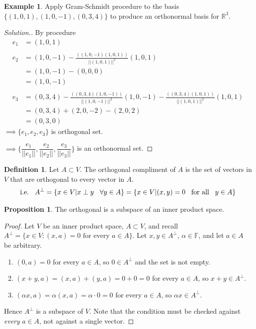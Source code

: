 \documentclass[11pt,a4paper]{article}
\theoremstyle{definition}
\newtheorem{defn}[thm]{Definition}
\newtheorem{exa}[thm]{Example}
\newtheorem{prop}[thm]{Proposition}
\newenvironment{solution}
  {\renewcommand{\qedsymbol}{}\begin{proof}[\textit{Solution}.]}
  {\end{proof}}
\begin{document}
\begin{exa}
Apply Gram-Schmidt procedure to the basis $\{(1,0,1),(1,0,-1),(0,3,4)\}$ to produce an orthonormal basis for $\mathbb{R}^3$.
\end{exa}
\begin{solution}
By procedure
\begin{align*}
e_1 &=(1,0,1)\\\\
e_2 &=(1,0,-1)-\frac{((1,0,-1)(1,0,1))}{||(1,0,1)||^2}(1,0,1)\\
    &=(1,0,-1)-(0,0,0)\\
    &=(1,0,-1)\\\\
e_3 &=(0,3,4)-\frac{((0,3,4)(1,0,-1))}{||(1,0,-1)||^2}(1,0,-1)-\frac{((0,3,4)(1,0,1))}{||(1,0,1)||^2}(1,0,1)\\
    &=(0,3,4)+(2,0,-2)-(2,0,2)\\
    &=(0,3,0)
\end{align*}
$\implies \{e_1,e_2,e_3\}$ is orthogonal set.

$\implies \Bigg\{\dfrac{e_1}{||e_1||},\dfrac{e_2}{||e_2||},\dfrac{e_3}{||e_3||}\Bigg\}$ is an orthonormal set.
\end{solution}


\begin{defn}
Let $A\subset V$. The orthogonal compliment of $A$ is the set of vectors in $V$ that are orthogonal to every vector in $A$.$$\text{i.e.}\hspace{0.3cm} A^{\perp}=\{x\in V|x\perp y\hspace{0.3cm} \forall y\in A\}=\{x\in V|(x,y)=0\hspace{0.3cm}\text{for all}\hspace{0.3cm} y\in A\}$$
\end{defn}


\begin{prop}
The orthogonal is a subspace of an inner product space.
\end{prop}


\begin{proof}
Let $V$ be an inner product space, $A\subset V$, and recall
$A^{\perp}=\{x\in V:(x,a)=0 \text{ for every } a\in A\}$. Let
$x,y\in A^{\perp}$, $\alpha\in\mathbb{F}$, and let $a\in A$ be arbitrary.
\begin{enumerate}
\item[i.] $(0,a)=0$ for every $a\in A$, so $0\in A^{\perp}$ and the set is not
empty.
\item[ii.] $(x+y,a)=(x,a)+(y,a)=0+0=0$ for every $a\in A$, so
$x+y\in A^{\perp}$.
\item[iii.] $(\alpha x,a)=\alpha(x,a)=\alpha\cdot 0=0$ for every $a\in A$, so
$\alpha x\in A^{\perp}$.
\end{enumerate}
Hence $A^{\perp}$ is a subspace of $V$. Note that the condition must be checked
against \emph{every} $a\in A$, not against a single vector.
\end{proof}
\end{document}
